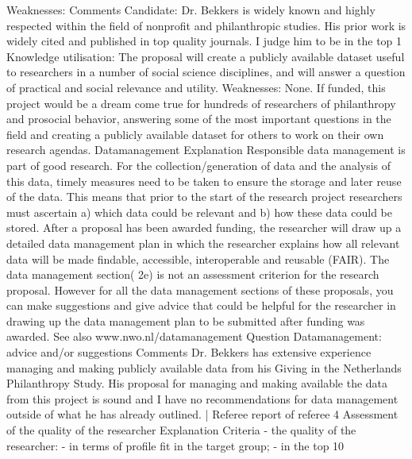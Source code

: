 \documentclass[twocolumn, serif, rga, numeric]{jote-article}
\begin{document}
Weaknesses:
Comments
Candidate: Dr. Bekkers is widely known and highly respected within the field of nonprofit and philanthropic studies. His prior work is widely cited and published in top quality journals. I judge him to be in the top 1%
Knowledge utilisation: The proposal will create a publicly available dataset useful to researchers in a number of social science disciplines, and will answer a question of practical and social relevance and utility.
Weaknesses: None. If funded, this project would be a dream come true for hundreds of researchers of philanthropy and prosocial behavior, answering some of the most important questions in the field and creating a publicly available dataset for others to work on their own research agendas.
Datamanagement
Explanation
Responsible data management is part of good research. For the collection/generation of data and the analysis of this data, timely measures need to be taken to ensure the storage and later reuse of the data. This means that prior to the start of the research project researchers must ascertain a) which data could be relevant and b) how these data could be stored. After a proposal has been awarded funding, the researcher will draw up a detailed data management plan in which the researcher explains how all relevant data will be made findable, accessible, interoperable and reusable (FAIR). The data management section( 2e) is not an assessment criterion for the research proposal. However for all the data management sections of these proposals, you can make suggestions and give advice that could be helpful for the researcher in drawing up the data management plan to be submitted after funding was awarded. See also www.nwo.nl/datamanagement
Question
Datamanagement: advice and/or suggestions
Comments
Dr. Bekkers has extensive experience managing and making publicly available data from his Giving in the Netherlands Philanthropy Study. His proposal for managing and making available the data from this project is sound and I have no recommendations for data management outside of what he has already outlined.
|  Referee report of referee 4
Assessment of the quality of the researcher
Explanation
Criteria - the quality of the researcher: - in terms of profile fit in the target group; - in the top 10%
\end{document}
